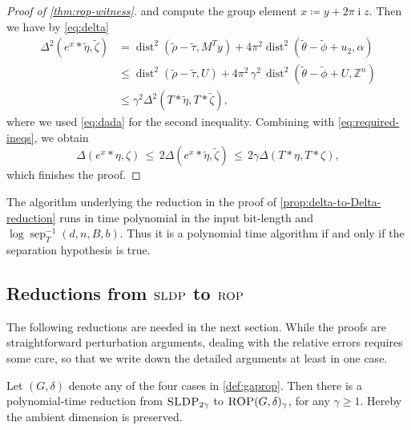 \documentclass[a4paper,USenglish,cleveref,numberwithinsect]{lipics-v2021}
\DeclareMathOperator{\sep}{sep}
\DeclareMathOperator{\ii}{i}
\DeclareMathOperator{\dist}{dist}
\newcommand{\ZZ}{\mathbb{Z}}
\numberwithin{equation}{section}
\begin{document}
\begin{proof}[Proof of \cref{thm:rop-witness}]
and compute the group element $x\coloneqq y + 2\pi\ii z$.
Then we have by \cref{eq:delta}
\[
\begin{split}
 \Delta^2(e^x\ast\tilde{\eta},\tilde{\zeta}) &= \dist^2(\tilde{\rho} -\tilde{\tau},M^Ty)
  + 4\pi^2 \dist^2( \tilde{\theta} -\tilde{\phi} + u_2,\alpha)\\
   &\leq \dist^2(\tilde{\rho} -\tilde{\tau}, U)
    + 4\pi^2\, \gamma^2 \, \dist^2( \tilde\theta -\tilde\phi + U, \ZZ^n)\\
   &\leq \gamma^2 \Delta^2(T\ast\tilde{\eta},T\ast\tilde{\zeta}) ,
\end{split}
\]
where we used \cref{eq:dada} for the second inequality.
Combining with \cref{eq:required-ineqs}, we obtain
\[
 \Delta(e^x\ast\eta,\zeta) \, \leq \, 2 \Delta(e^x\ast\tilde{\eta},\tilde{\zeta})
  \, \leq \, 2\gamma \Delta(T\ast\eta,T\ast\zeta) ,
\]
which finishes the proof.
\end{proof}


\begin{remark}\label{rem:poly-time-iff-sep-hyp}
The algorithm underlying the reduction
in the proof of \cref{prop:delta-to-Delta-reduction}
runs in time polynomial in the input bit-length and $\log\sep_T^{-1}(d,n,B,b)$.
Thus it is a polynomial time algorithm if and only if the separation hypothesis is true.
\end{remark}

\subsection{Reductions from \texorpdfstring{$\textsc{SLDP}$}{SLDP} to \texorpdfstring{$\textsc{ROP}$}{ROP}}
The following reductions are needed in the next section.
While the proofs are straightforward perturbation arguments,
dealing with the relative errors requires some care,
so that we write down the detailed arguments at least in one case.


\begin{lemma}\label{thm:sldp-is-hard-and-reductions}
Let $(G,\delta)$ denote any of the four cases in \cref{def:gaprop}.
Then there is a polynomial-time reduction from
$\textsc{SLDP}_{2\gamma}$ to $\textsc{ROP}(G,\delta)_\gamma$,
for any $\gamma \ge 1$.
Hereby the ambient dimension is preserved.
\end{lemma}
\end{document}
